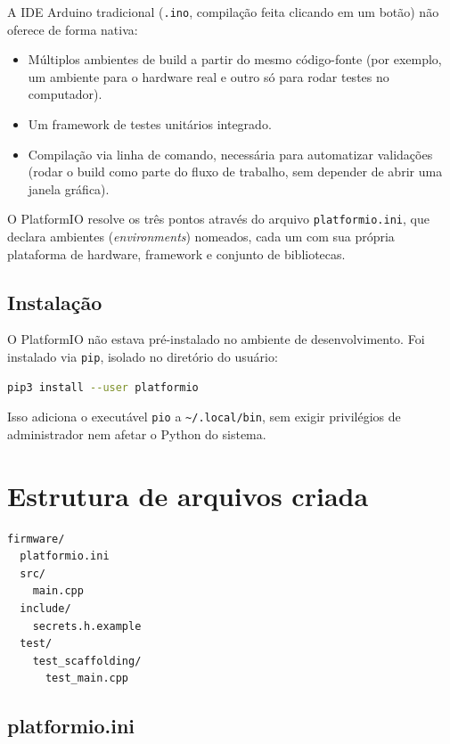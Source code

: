 \documentclass[11pt,a4paper]{article}
\begin{document}
A IDE Arduino tradicional (\texttt{.ino}, compilação feita clicando em um botão) não oferece de forma nativa:

\begin{itemize}
    \item Múltiplos ambientes de build a partir do mesmo código-fonte (por exemplo, um ambiente para o hardware real e outro só para rodar testes no computador).
    \item Um framework de testes unitários integrado.
    \item Compilação via linha de comando, necessária para automatizar validações (rodar o build como parte do fluxo de trabalho, sem depender de abrir uma janela gráfica).
\end{itemize}

O PlatformIO resolve os três pontos através do arquivo \texttt{platformio.ini}, que declara ambientes (\textit{environments}) nomeados, cada um com sua própria plataforma de hardware, framework e conjunto de bibliotecas.

\subsection{Instalação}

O PlatformIO não estava pré-instalado no ambiente de desenvolvimento. Foi instalado via \texttt{pip}, isolado no diretório do usuário:

\begin{lstlisting}[language=bash,caption={Instalação do PlatformIO}]
pip3 install --user platformio
\end{lstlisting}

Isso adiciona o executável \texttt{pio} a \texttt{\textasciitilde/.local/bin}, sem exigir privilégios de administrador nem afetar o Python do sistema.

\section{Estrutura de arquivos criada}

\begin{lstlisting}[language=bash,caption={Estrutura do diretório firmware/}]
firmware/
  platformio.ini
  src/
    main.cpp
  include/
    secrets.h.example
  test/
    test_scaffolding/
      test_main.cpp
\end{lstlisting}

\subsection{platformio.ini}
\end{document}
